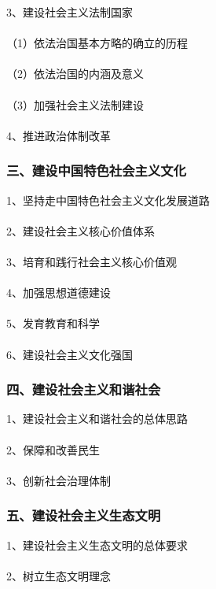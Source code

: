 \documentclass{ctexart}
\begin{document}
3、建设社会主义法制国家
\\\\
（1）依法治国基本方略的确立的历程
\\\\
（2）依法治国的内涵及意义
\\\\
（3）加强社会主义法制建设
\\\\

4、推进政治体制改革

\subsubsection{三、建设中国特色社会主义文化}
1、坚持走中国特色社会主义文化发展道路
\\\\

2、建设社会主义核心价值体系
\\\\

3、培育和践行社会主义核心价值观
\\\\

4、加强思想道德建设
\\\\

5、发育教育和科学
\\\\

6、建设社会主义文化强国

\subsubsection{四、建设社会主义和谐社会}
1、建设社会主义和谐社会的总体思路
\\\\

2、保障和改善民生
\\\\

3、创新社会治理体制

\subsubsection{五、建设社会主义生态文明}
1、建设社会主义生态文明的总体要求
\\\\

2、树立生态文明理念
\\\\
\end{document}
